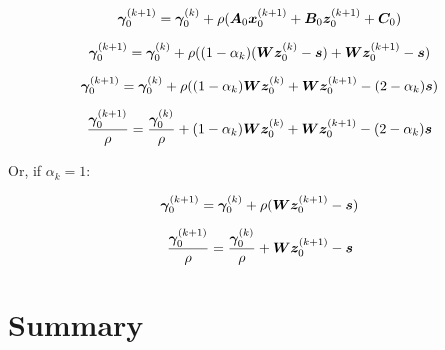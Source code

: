 \begin{equation}
\bm{\gamma}_0^{(k + 1)} = \bm{\gamma}_0^{(k)} + \rho(\bm{A}_0\bm{x}_0^{(k + 1)} + \bm{B}_0\bm{z}_0^{(k + 1)} + \bm{C}_0)
\end{equation}

\begin{equation}
\bm{\gamma}_0^{(k + 1)} = \bm{\gamma}_0^{(k)} + \rho((1 - \alpha_k)(\bm{W}\bm{z}_0^{(k)} - \bm{s}) + \bm{W}\bm{z}_0^{(k + 1)} - \bm{s})
\end{equation}

\begin{equation}
\bm{\gamma}_0^{(k + 1)} = \bm{\gamma}_0^{(k)} + \rho((1 - \alpha_k)\bm{W}\bm{z}_0^{(k)} + \bm{W}\bm{z}_0^{(k + 1)} - (2 - \alpha_k)\bm{s})
\end{equation}

\begin{equation}
\frac{\bm{\gamma}_0^{(k + 1)}}{\rho} = \frac{\bm{\gamma}_0^{(k)}}{\rho} + (1 - \alpha_k)\bm{W}\bm{z}_0^{(k)} + \bm{W}\bm{z}_0^{(k + 1)} - (2 - \alpha_k)\bm{s}
\end{equation}

Or, if $\alpha_k = 1$:

\begin{equation}
\bm{\gamma}_0^{(k + 1)} = \bm{\gamma}_0^{(k)} + \rho(\bm{W}\bm{z}_0^{(k + 1)} - \bm{s})
\end{equation}

\begin{equation}
\frac{\bm{\gamma}_0^{(k + 1)}}{\rho} = \frac{\bm{\gamma}_0^{(k)}}{\rho} + \bm{W}\bm{z}_0^{(k + 1)} - \bm{s}
\end{equation}
\section{Summary}
